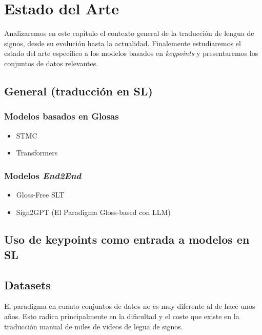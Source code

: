\chapter{Estado del Arte}
Analizaremos en este capítulo el contexto general de la traducción de lengua de signos, desde su evolución hasta la actualidad. Finalemente estudiaremos el estado del arte especifico a los modelos basados en \textit{keypoints} y presentaremos los conjuntos de datos relevantes.

\section{General (traducción en SL)}

\subsection{Modelos basados en Glosas}
\begin{itemize}
    \item STMC
    \item Transformers
\end{itemize}

\subsection{Modelos \textit{End2End}}
\begin{itemize}
    \item Gloss-Free SLT
    \item Sign2GPT (El Paradigma Gloss-based con LLM)
\end{itemize}



\section{Uso de keypoints como entrada a modelos en SL}

\section{Datasets}
El paradigma en cuanto conjuntos de datos no es muy diferente al de hace unos años. Esto radica principalmente en la dificultad y el coste que existe en la traducción manual de miles de videos de legua de signos.
